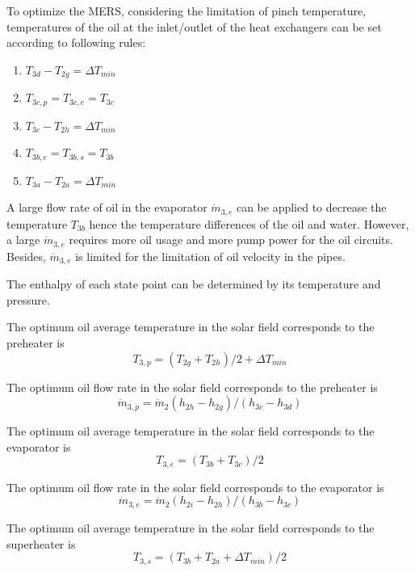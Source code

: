 To optimize the MERS, considering the limitation of pinch temperature, temperatures of the oil at the inlet/outlet of the heat exchangers can be set according to following rules:
\begin{enumerate}
  \item $T_{3d} - T_{2g} = \Delta T_{min}$
  \item $T_{3c,p} = T_{3c,e} = T_{3c}$
  \item $T_{3c} - T_{2h} = \Delta T_{min}$
  \item $T_{3b,e} = T_{3b,s} = T_{3b}$
  \item $T_{3a} - T_{2a} = \Delta T_{min}$
\end{enumerate}

A large flow rate of oil in the evaporator $\dot{m}_{3,e}$ can be applied to decrease the temperature $T_{3b}$ hence the temperature differences of the oil and water. However, a large $\dot{m}_{3,e}$ requires more oil usage and more pump power for the oil circuits. Besides, $\dot{m}_{3,e}$ is limited for the limitation of oil velocity in the pipes.

The enthalpy of each state point can be determined by its temperature and pressure.

The optimum oil average temperature in the solar field corresponds to the preheater is
\begin{equation}
  T_{3,p} = (T_{2g} + T_{2h})/2 + \Delta T_{min}
\end{equation}

The optimum oil flow rate in the solar field corresponds to the preheater is
\begin{equation}
  \dot{m}_{3,p} = \dot{m}_{2}(h_{2h} - h_{2g})/(h_{3c} - h_{3d})
\end{equation}

The optimum oil average temperature in the solar field corresponds to the evaporator is
\begin{equation}
  T_{3,e} = (T_{3b} + T_{3c})/2
\end{equation}

The optimum oil flow rate in the solar field corresponds to the evaporator is
\begin{equation}\label{eq:m_3e}
  \dot{m}_{3,e} = \dot{m}_{2}(h_{2i} - h_{2h})/(h_{3b} - h_{3c})
\end{equation}

The optimum oil average temperature in the solar field corresponds to the superheater is
\begin{equation}
  T_{3,s} = (T_{3b} + T_{2a} + \Delta T_{min})/2
\end{equation}

